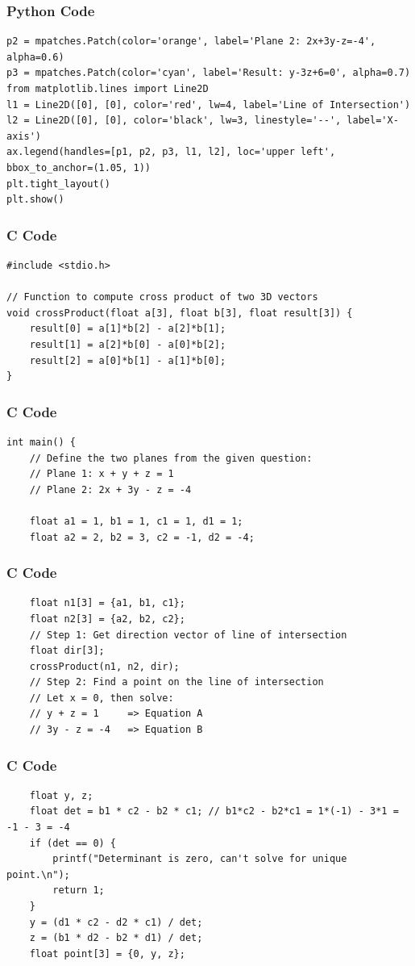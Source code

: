\documentclass{beamer}
\begin{document}
\begin{frame}[fragile]
\frametitle{Python Code}
\begin{lstlisting}
p2 = mpatches.Patch(color='orange', label='Plane 2: 2x+3y-z=-4', alpha=0.6)
p3 = mpatches.Patch(color='cyan', label='Result: y-3z+6=0', alpha=0.7)
from matplotlib.lines import Line2D
l1 = Line2D([0], [0], color='red', lw=4, label='Line of Intersection')
l2 = Line2D([0], [0], color='black', lw=3, linestyle='--', label='X-axis')
ax.legend(handles=[p1, p2, p3, l1, l2], loc='upper left', bbox_to_anchor=(1.05, 1))
plt.tight_layout()
plt.show()
\end{lstlisting}
\end{frame}



\begin{frame}[fragile]
\frametitle{C Code}
\begin{lstlisting}
#include <stdio.h>

// Function to compute cross product of two 3D vectors
void crossProduct(float a[3], float b[3], float result[3]) {
    result[0] = a[1]*b[2] - a[2]*b[1];
    result[1] = a[2]*b[0] - a[0]*b[2];
    result[2] = a[0]*b[1] - a[1]*b[0];
}
\end{lstlisting}
\end{frame}

\begin{frame}[fragile]
\frametitle{C Code}
\begin{lstlisting}
int main() {
    // Define the two planes from the given question:
    // Plane 1: x + y + z = 1
    // Plane 2: 2x + 3y - z = -4
    
    float a1 = 1, b1 = 1, c1 = 1, d1 = 1;
    float a2 = 2, b2 = 3, c2 = -1, d2 = -4;
\end{lstlisting}
\end{frame}

\begin{frame}[fragile]
\frametitle{C Code}
\begin{lstlisting}
    float n1[3] = {a1, b1, c1};
    float n2[3] = {a2, b2, c2};
    // Step 1: Get direction vector of line of intersection
    float dir[3];
    crossProduct(n1, n2, dir);
    // Step 2: Find a point on the line of intersection
    // Let x = 0, then solve:
    // y + z = 1     => Equation A
    // 3y - z = -4   => Equation B
\end{lstlisting}
\end{frame}

\begin{frame}[fragile]
\frametitle{C Code}
\begin{lstlisting}
    float y, z;
    float det = b1 * c2 - b2 * c1; // b1*c2 - b2*c1 = 1*(-1) - 3*1 = -1 - 3 = -4
    if (det == 0) {
        printf("Determinant is zero, can't solve for unique point.\n");
        return 1;
    }
    y = (d1 * c2 - d2 * c1) / det;
    z = (b1 * d2 - b2 * d1) / det;
    float point[3] = {0, y, z};
\end{lstlisting}
\end{frame}
\end{document}
